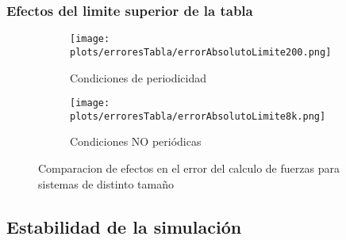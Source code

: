 % 


% 
% 
% 
% 


\subsubsection{Efectos del limite superior de la tabla}

\begin{figure}[htbp]
\centering
\begin{subfigure}[b]{\plotwidthtres}
   \texttt{[image: plots/erroresTabla/errorAbsolutoLimite200.png]}
   \caption{Condiciones de periodicidad}
   \label{compar-1iter}
 \end{subfigure}
\begin{subfigure}[b]{\plotwidthtres}
   \texttt{[image: plots/erroresTabla/errorAbsolutoLimite8k.png]}
   \caption{Condiciones NO periódicas}
   \label{compar-niter}
 \end{subfigure}
 \caption{Comparacion de efectos en el error del calculo de fuerzas para sistemas de distinto tamaño}
 \label{time-vs-cut}
\end{figure}





\subsection{Estabilidad de la simulación}


